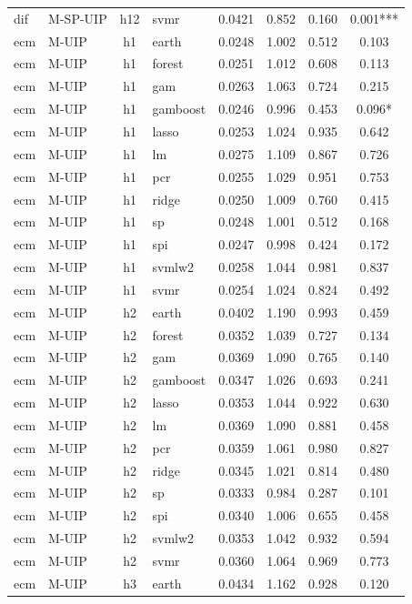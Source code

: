 \begin{ThreePartTable}
\begin{longtable}[t]{llclcccc}
dif & M-SP-UIP & h12 & svmr & 0.0421 & 0.852 & 0.160 & 0.001***\\
\addlinespace
ecm & M-UIP & h1 & earth & 0.0248 & 1.002 & 0.512 & 0.103\\
ecm & M-UIP & h1 & forest & 0.0251 & 1.012 & 0.608 & 0.113\\
ecm & M-UIP & h1 & gam & 0.0263 & 1.063 & 0.724 & 0.215\\
ecm & M-UIP & h1 & gamboost & 0.0246 & 0.996 & 0.453 & 0.096*\\
ecm & M-UIP & h1 & lasso & 0.0253 & 1.024 & 0.935 & 0.642\\
ecm & M-UIP & h1 & lm & 0.0275 & 1.109 & 0.867 & 0.726\\
ecm & M-UIP & h1 & pcr & 0.0255 & 1.029 & 0.951 & 0.753\\
ecm & M-UIP & h1 & ridge & 0.0250 & 1.009 & 0.760 & 0.415\\
ecm & M-UIP & h1 & sp & 0.0248 & 1.001 & 0.512 & 0.168\\
ecm & M-UIP & h1 & spi & 0.0247 & 0.998 & 0.424 & 0.172\\
ecm & M-UIP & h1 & svmlw2 & 0.0258 & 1.044 & 0.981 & 0.837\\
ecm & M-UIP & h1 & svmr & 0.0254 & 1.024 & 0.824 & 0.492\\
\addlinespace
ecm & M-UIP & h2 & earth & 0.0402 & 1.190 & 0.993 & 0.459\\
ecm & M-UIP & h2 & forest & 0.0352 & 1.039 & 0.727 & 0.134\\
ecm & M-UIP & h2 & gam & 0.0369 & 1.090 & 0.765 & 0.140\\
ecm & M-UIP & h2 & gamboost & 0.0347 & 1.026 & 0.693 & 0.241\\
ecm & M-UIP & h2 & lasso & 0.0353 & 1.044 & 0.922 & 0.630\\
ecm & M-UIP & h2 & lm & 0.0369 & 1.090 & 0.881 & 0.458\\
ecm & M-UIP & h2 & pcr & 0.0359 & 1.061 & 0.980 & 0.827\\
ecm & M-UIP & h2 & ridge & 0.0345 & 1.021 & 0.814 & 0.480\\
ecm & M-UIP & h2 & sp & 0.0333 & 0.984 & 0.287 & 0.101\\
ecm & M-UIP & h2 & spi & 0.0340 & 1.006 & 0.655 & 0.458\\
ecm & M-UIP & h2 & svmlw2 & 0.0353 & 1.042 & 0.932 & 0.594\\
ecm & M-UIP & h2 & svmr & 0.0360 & 1.064 & 0.969 & 0.773\\
\addlinespace
ecm & M-UIP & h3 & earth & 0.0434 & 1.162 & 0.928 & 0.120\\

\end{longtable}
\end{ThreePartTable}
